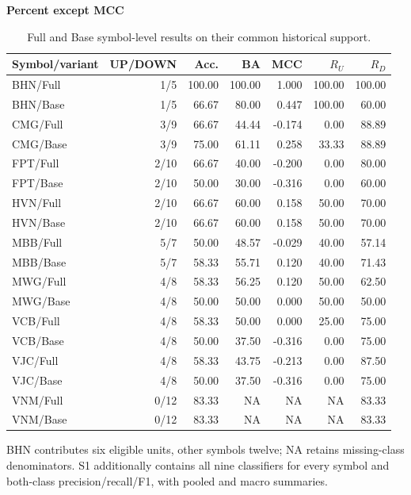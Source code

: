 \begin{table}[!htbp]
\centering\small
\setlength{\tabcolsep}{3pt}
\renewcommand{\arraystretch}{1.15}
\caption{Full and Base symbol-level results on their common historical support.}
\label{tab:symbol_results}
\textbf{Percent except MCC}\par\smallskip
\begin{tabular}{lrrrrrr}
\hline
Symbol/variant & UP/DOWN & Acc. & BA & MCC & $R_U$ & $R_D$ \\
\hline
BHN/Full & 1/5 & 100.00 & 100.00 & 1.000 & 100.00 & 100.00 \\
BHN/Base & 1/5 & 66.67 & 80.00 & 0.447 & 100.00 & 60.00 \\
CMG/Full & 3/9 & 66.67 & 44.44 & -0.174 & 0.00 & 88.89 \\
CMG/Base & 3/9 & 75.00 & 61.11 & 0.258 & 33.33 & 88.89 \\
FPT/Full & 2/10 & 66.67 & 40.00 & -0.200 & 0.00 & 80.00 \\
FPT/Base & 2/10 & 50.00 & 30.00 & -0.316 & 0.00 & 60.00 \\
HVN/Full & 2/10 & 66.67 & 60.00 & 0.158 & 50.00 & 70.00 \\
HVN/Base & 2/10 & 66.67 & 60.00 & 0.158 & 50.00 & 70.00 \\
MBB/Full & 5/7 & 50.00 & 48.57 & -0.029 & 40.00 & 57.14 \\
MBB/Base & 5/7 & 58.33 & 55.71 & 0.120 & 40.00 & 71.43 \\
MWG/Full & 4/8 & 58.33 & 56.25 & 0.120 & 50.00 & 62.50 \\
MWG/Base & 4/8 & 50.00 & 50.00 & 0.000 & 50.00 & 50.00 \\
VCB/Full & 4/8 & 58.33 & 50.00 & 0.000 & 25.00 & 75.00 \\
VCB/Base & 4/8 & 50.00 & 37.50 & -0.316 & 0.00 & 75.00 \\
VJC/Full & 4/8 & 58.33 & 43.75 & -0.213 & 0.00 & 87.50 \\
VJC/Base & 4/8 & 50.00 & 37.50 & -0.316 & 0.00 & 75.00 \\
VNM/Full & 0/12 & 83.33 & NA & NA & NA & 83.33 \\
VNM/Base & 0/12 & 83.33 & NA & NA & NA & 83.33 \\
\hline
\end{tabular}\par\medskip
\begin{minipage}{\textwidth}\footnotesize BHN contributes six eligible units, other symbols twelve; NA retains missing-class denominators. S1 additionally contains all nine classifiers for every symbol and both-class precision/recall/F1, with pooled and macro summaries.\end{minipage}
\end{table}
